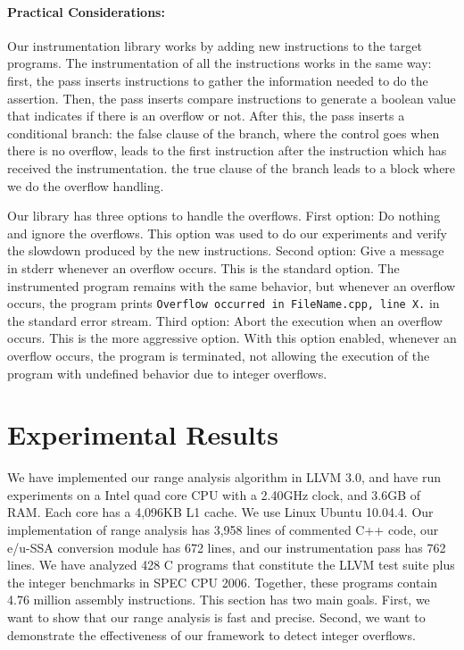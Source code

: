 \documentclass[preprint]{sigplanconf}[10pt]
\begin{document}
\paragraph{Practical Considerations: }
Our instrumentation library works by adding new instructions to
the target programs.
The instrumentation of all the instructions works
in the same way: first, the pass inserts instructions to gather the
information needed to do the assertion.
Then, the pass inserts compare instructions to generate a boolean value
that indicates if there is an overflow or not. 
After this, the pass inserts a conditional branch: 
the false clause of the branch, where the control goes when there is no 
overflow, leads to the first instruction after the instruction
which has received the instrumentation.
the true clause of the branch leads to a block where we do the
overflow handling. 

Our library has three options to handle the overflows. 
First option: Do nothing and ignore the overflows. This option
was used to do our experiments and verify the slowdown produced 
by the new instructions.
Second option: Give a message in stderr whenever an overflow occurs.
This is the standard option. The instrumented program remains with 
the same behavior, but whenever an overflow occurs, the program
prints \texttt{Overflow occurred in FileName.cpp, line X.} in the
standard error stream.
Third option: Abort the execution when an overflow occurs.
This is the more aggressive option. With this option enabled,
whenever an overflow occurs, the program is terminated, not allowing
the execution of the program with undefined behavior due to 
integer overflows.

\section{Experimental Results}
\label{sec:exp}

We have implemented our range analysis algorithm in LLVM 3.0, and have run
experiments on a Intel quad core CPU with a 2.40GHz clock, and 3.6GB of RAM.
Each core has a 4,096KB L1 cache.
We use Linux Ubuntu 10.04.4.
Our implementation of range analysis has 3,958 lines of
commented C++ code, our e/u-SSA conversion module has 672 lines, and our
instrumentation pass has 762 lines.
We have analyzed 428 C programs that constitute the LLVM test suite plus the
integer benchmarks in SPEC CPU 2006.
Together, these programs contain 4.76 million assembly instructions.
This section has two main goals.
First, we want to show that our range analysis is fast and precise.
Second, we want to demonstrate the effectiveness of our framework to detect
integer overflows.
\end{document}

